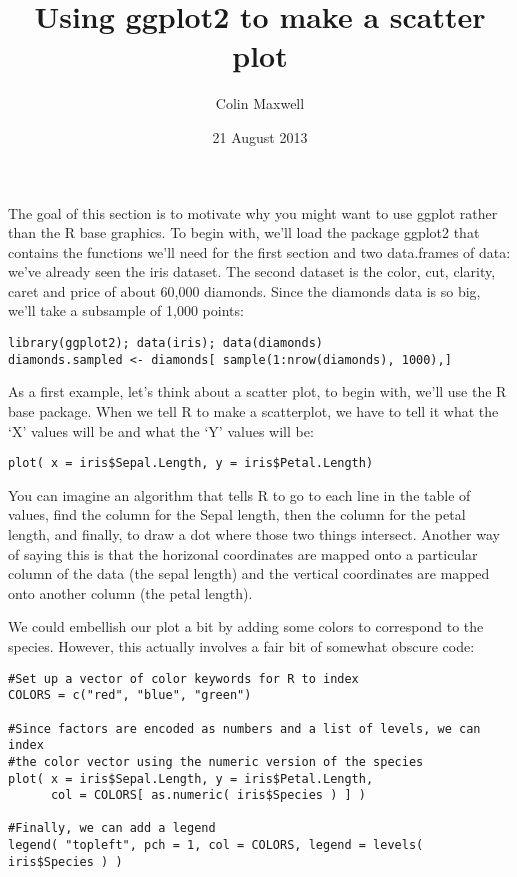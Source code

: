 \documentclass[11pt]{article}
\title{Using ggplot2 to make a scatter plot}
\author{Colin Maxwell}
\date{21 August 2013}
\begin{document}
\maketitle

\setcounter{tocdepth}{3}
\tableofcontents
\vspace*{1cm}
The goal of this section is to motivate why you might want to use
ggplot rather than the R base graphics. To begin with, we'll load the
package ggplot2 that contains the functions we'll need for the first
section and two data.frames of data: we've already seen the iris
dataset. The second dataset is the color, cut, clarity, caret and
price of about 60,000 diamonds. Since the diamonds data is so big,
we'll take a subsample of 1,000 points:

\begin{verbatim}
library(ggplot2); data(iris); data(diamonds)
diamonds.sampled <- diamonds[ sample(1:nrow(diamonds), 1000),]
\end{verbatim}

As a first example, let's think about a scatter plot, to begin with,
  we'll use the R base package. When we tell R to make a scatterplot,
  we have to tell it what the `X' values will be and what the `Y'
  values will be:

\begin{verbatim}
plot( x = iris$Sepal.Length, y = iris$Petal.Length)
\end{verbatim}


You can imagine an algorithm that tells R to go to each line in the
  table of values, find the column for the Sepal length, then the
  column for the petal length, and finally, to draw a dot where those
  two things intersect. Another way of saying this is that the
  horizonal coordinates are mapped onto a particular column of the
  data (the sepal length) and the vertical coordinates are mapped onto
  another column (the petal length).

 We could embellish our plot a bit by adding some colors to
  correspond to the species. However, this actually involves a fair
  bit of somewhat obscure code:


\begin{verbatim}
#Set up a vector of color keywords for R to index
COLORS = c("red", "blue", "green")

#Since factors are encoded as numbers and a list of levels, we can index
#the color vector using the numeric version of the species
plot( x = iris$Sepal.Length, y = iris$Petal.Length,
      col = COLORS[ as.numeric( iris$Species ) ] )

#Finally, we can add a legend
legend( "topleft", pch = 1, col = COLORS, legend = levels( iris$Species ) )
\end{verbatim}
\end{document}
